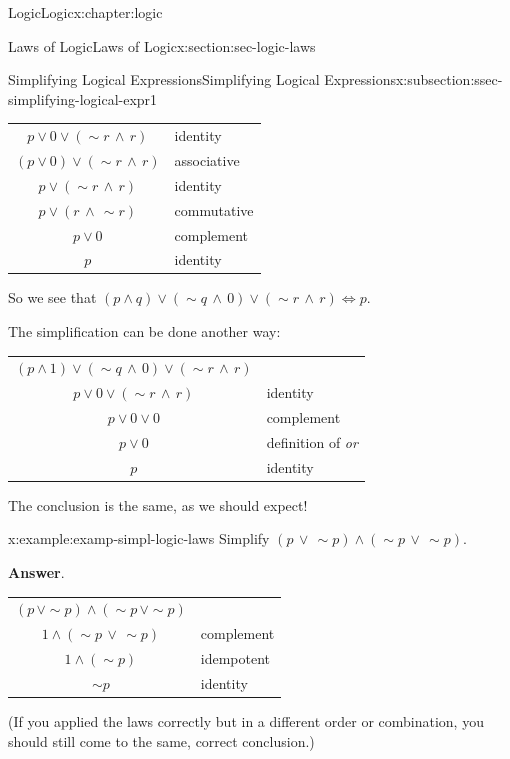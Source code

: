 \documentclass[twoside,10pt,]{book}
\newcommand{\blocktitlefont}{\relax}
\newcommand{\tabularfont}{\relax}
\numberwithin{equation}{section}
\begin{document}
\begin{chapterptx}{Logic}{}{Logic}{}{}{x:chapter:logic}
\begin{sectionptx}{Laws of Logic}{}{Laws of Logic}{}{}{x:section:sec-logic-laws}
\begin{subsectionptx}{Simplifying Logical Expressions}{}{Simplifying Logical Expressions}{}{}{x:subsection:ssec-simplifying-logical-expr1}
\begin{center}
{\begin{tabular}{cc}
\(p{\vee} 0{\vee}(\sim\!{r}\,{\wedge}\,r)\)&\multicolumn{1}{l}{identity}\tabularnewline[0pt]
\((p{\vee} 0){\vee}(\sim\!{r}\,{\wedge}\,r)\)&\multicolumn{1}{l}{associative}\tabularnewline[0pt]
\(p{\vee}(\sim\!{r}\,{\wedge}\,r)\)&\multicolumn{1}{l}{identity}\tabularnewline[0pt]
\(p{\vee}(r\,{\wedge}\,\sim\!{r})\)&\multicolumn{1}{l}{commutative}\tabularnewline[0pt]
\(p{\vee} 0\)&\multicolumn{1}{l}{complement}\tabularnewline[0pt]
\(p\)&\multicolumn{1}{l}{identity}
\end{tabular}
}%
\end{center}%
 So we see that \((p{\wedge} q){\vee}(\sim\!{q}\,{\wedge}\, 0){\vee}(\sim\!{r}\,{\wedge}\,r)\Leftrightarrow p\).%
\par
The simplification can be done another way: \begin{center}%
{\tabularfont%
\begin{tabular}{cc}
\((p{\wedge} 1){\vee}(\sim\!{q}\,{\wedge} \,0){\vee}(\sim\!{r}\,{\wedge}\,r)\)&\tabularnewline[0pt]
\(p{\vee} 0{\vee}(\sim\!{r}\,{\wedge}\,r)\)&\multicolumn{1}{l}{identity}\tabularnewline[0pt]
\(p{\vee} 0{\vee} 0\)&\multicolumn{1}{l}{complement}\tabularnewline[0pt]
\(p{\vee} 0\)&\multicolumn{1}{l}{definition of \emph{or}}\tabularnewline[0pt]
\(p\)&\multicolumn{1}{l}{identity}
\end{tabular}
}%
\end{center}%
 The conclusion is the same, as we should expect!%
\begin{example}{}{x:example:examp-simpl-logic-laws}%
Simplify \((p\,{\vee}\,\sim\!{p}){\wedge}(\sim\!{p}\,{\vee}\,\sim\!{p})\).\par\smallskip%
\noindent\textbf{\blocktitlefont Answer}.\label{g:answer:idp28298600}{}\hypertarget{g:answer:idp28298600}{}\quad{}\begin{center}%
{\tabularfont%
\begin{tabular}{cc}
\((p\,{\vee}\sim\!{p}){\wedge}(\sim\!{p}\,{\vee}\sim\!{p})\)&\multicolumn{1}{l}{}\tabularnewline[0pt]
\(1{\wedge}(\sim\!{p}\,{\vee}\,\sim\!{p})\)&\multicolumn{1}{l}{complement}\tabularnewline[0pt]
\(1{\wedge}(\sim\!{p})\)&\multicolumn{1}{l}{idempotent}\tabularnewline[0pt]
\(\sim\!{p}\)&\multicolumn{1}{l}{identity}
\end{tabular}
}%
\end{center}%
 (If you applied the laws correctly but in a different order or combination, you should still come to the same, correct conclusion.)\end{example}
\end{subsectionptx}
%
%
\typeout{************************************************}

\end{sectionptx}
\end{chapterptx}
\end{document}

